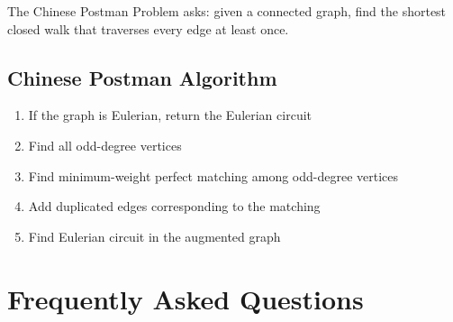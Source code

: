 The Chinese Postman Problem asks: given a connected graph, find the shortest closed walk
that traverses every edge at least once.

\subsection{Chinese Postman Algorithm}
\begin{enumerate}
\item If the graph is Eulerian, return the Eulerian circuit
\item Find all odd-degree vertices
\item Find minimum-weight perfect matching among odd-degree vertices
\item Add duplicated edges corresponding to the matching
\item Find Eulerian circuit in the augmented graph
\end{enumerate}

\section{Frequently Asked Questions}

